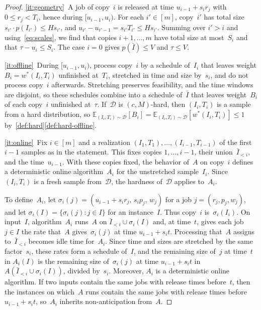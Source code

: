 \documentclass[11pt,letterpaper]{article}
\theoremstyle{definition}
\theoremstyle{remark}
\newcommand{\E}{\mathbb{E}}
\newcommand{\cD}{\mathcal{D}}
\begin{document}
\begin{proof}
\ref{it:geometry}~A job of copy~$i$ is released at time $u_{i-1}+s_ir_j$ with $0\le r_j<T_i$, hence during $[u_{i-1},u_i)$. For each $i'\in[m]$, copy~$i'$ has total size $s_{i'}\cdot p(I_{i'})\le Hs_{i'}$, and $u_{i'}-u_{i'-1}=s_{i'}T_{i'}\le Hs_{i'}$. Summing over $i'>i$ and using~\eqref{eq:scales}, we find that copies $i+1,\dots,m$ have total size at most~$S_i$ and that $\tau-u_i\le S_i$. The case $i=0$ gives $p(\bar I)\le V$ and $\tau\le V$.

\ref{it:offline}~During $[u_{i-1},u_i)$, process copy~$i$ by a schedule of~$I_i$ that leaves weight $B_i=w^*(I_i,T_i)$ unfinished at~$T_i$, stretched in time and size by~$s_i$, and do not process copy~$i$ afterwards. Stretching preserves feasibility, and the time windows are disjoint, so these schedules combine into a schedule of~$\bar I$ that leaves weight~$B_i$ of each copy~$i$ unfinished at~$\tau$. If~$\cD$ is $(c,M)$-hard, then $(I_i,T_i)$ is a sample from a hard distribution, so $\E_{(I_i,T_i)\sim\cD}[B_i]=\E_{(I_i,T_i)\sim\cD}[w^*(I_i,T_i)]\le1$ by~\cref{def:hard}\ref{def:hard-offline}.

\ref{it:online}~Fix $i\in[m]$ and a realization $(I_1,T_1),\dots,(I_{i-1},T_{i-1})$ of the first $i-1$ samples as in the statement. This fixes copies $1,\dots,i-1$, their union~$\bar I_{<i}$, and the time~$u_{i-1}$. With these copies fixed, the behavior of~$A$ on copy~$i$ defines a deterministic online algorithm~$A_i$ for the unstretched sample~$I_i$. Since~$(I_i,T_i)$ is a fresh sample from~$\cD$, the hardness of~$\cD$ applies to~$A_i$.

To define~$A_i$, let $\sigma_i(j)=(u_{i-1}+s_ir_j,\,s_ip_j,\,w_j)$ for a job $j=(r_j,p_j,w_j)$, and let $\sigma_i(I)=\{\sigma_i(j):j\in I\}$ for an instance~$I$. Thus copy~$i$ is~$\sigma_i(I_i)$. On input~$I$, algorithm~$A_i$ runs~$A$ on $\bar I_{<i}\cup\sigma_i(I)$ and, at time~$t$, gives each job $j\in I$ the rate that~$A$ gives~$\sigma_i(j)$ at time $u_{i-1}+s_it$. Processing that~$A$ assigns to~$\bar I_{<i}$ becomes idle time for~$A_i$. Since time and sizes are stretched by the same factor~$s_i$, these rates form a schedule of~$I$, and the remaining size of~$j$ at time~$t$ in $A_i(I)$ is the remaining size of~$\sigma_i(j)$ at time $u_{i-1}+s_it$ in $A(\bar I_{<i}\cup\sigma_i(I))$, divided by~$s_i$. Moreover, $A_i$ is a deterministic online algorithm. If two inputs contain the same jobs with release times before~$t$, then the instances on which~$A$ runs contain the same jobs with release times before $u_{i-1}+s_it$, so~$A_i$ inherits non-anticipation from~$A$.


\end{proof}
\end{document}
